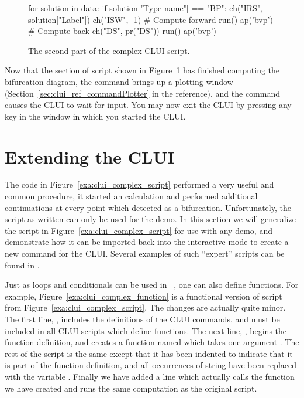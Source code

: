 \begin{figure}[htbp]
{\small \begin{center} \begin{boxedverbatim}
for solution in data:
    if solution["Type name"] == "BP":
        ch("IRS", solution["Label"])
        ch("ISW", -1)
        # Compute forward
        run()
        ap('bvp')
        # Compute back
        ch("DS",-pr("DS"))
        run()
        ap('bvp')
\end{boxedverbatim}
\end{center} 
}
\caption[The second part of the  complex \AUTOc CLUI script.]
{The second part of the  complex \AUTOc CLUI script.}
\label{exa:clui_complex_third}
\end{figure}

Now that the section of script shown in 
Figure~\ref{exa:clui_complex_third} has finished computing the
bifurcation diagram, the command 
brings up a plotting window 
(Section~\ref{sec:clui_ref_commandPlotter} in the reference),
and the command  causes the \AUTOc CLUI
to wait for input.  You may now exit the \AUTOc CLUI
by pressing any key in the window in which you started
the \AUTOc CLUI.

\section{ Extending the \AUTOc CLUI } \label{sec:clui_extending}

The code in Figure~\ref{exa:clui_complex_script}
performed a very useful and common procedure, it started an \AUTOc
calculation and performed additional continuations
at every point which \AUTOc detected as a bifurcation.
Unfortunately, the script as written can only be used
for the  demo.  In this section we will 
generalize the script in Figure~\ref{exa:clui_complex_script}
for use with any demo, and demonstrate how it
can be imported back into the interactive
mode to create a new command
for the \AUTOc CLUI.  Several examples of such
``expert'' scripts can be found in .

Just as loops and conditionals can be used in \python~,
one can also define functions.  For example,
Figure~\ref{exa:clui_complex_function} is a
functional version of script from 
Figure~\ref{exa:clui_complex_script}.
The changes are actually quite minor.  
The first line, ,
includes the definitions of the \AUTOc CLUI commands,
and must be included in all \AUTOc CLUI scripts
which define functions.
The next line, 
,
begins the function definition, and 
creates a function named  which
takes one argument .  The
rest of the script is the same except that it
has been indented to indicate that it is
part of the function definition, and all occurrences
of string  have been replaced
with the variable .
Finally we have added a line 
which actually calls the function we have 
created and runs the same computation as
the original script.

